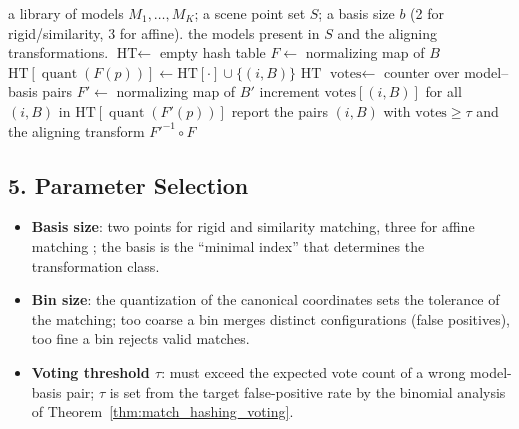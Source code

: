 \begin{algorithm}[htbp]
\caption{Geometric Hashing (Recognition)}
\label{alg:match_geometric_hashing}
\begin{algorithmic}[1]
\Require a library of models $M_1, \dots, M_K$; a scene point set $S$; a
       basis size $b$ (2 for rigid/similarity, 3 for affine).
\Ensure the models present in $S$ and the aligning transformations.
  \State $\text{HT} \gets$ empty hash table
      \State $F \gets$ normalizing map of $B$
        \State $\text{HT}[ \operatorname{quant}(F(p)) ] \gets
               \text{HT}[ \cdot ] \cup \{ (i, B) \}$
      \EndFor
    \EndFor
  \EndFor
  \State \Return $\text{HT}$
\EndFunction
{}
  \State $\text{votes} \gets$ counter over model--basis pairs
    \State $F' \gets$ normalizing map of $B'$
      \State increment $\text{votes}[(i, B)]$ for all $(i, B)$ in
             $\text{HT}[ \operatorname{quant}(F'(p)) ]$
    \EndFor
    \State report the pairs $(i, B)$ with $\text{votes} \ge \tau$ and the
           aligning transform $F'^{-1} \circ F$
  \EndFor
\EndFunction
\end{algorithmic}
\end{algorithm}

\subsection{5. Parameter Selection}

\begin{itemize}
\item \textbf{Basis size}: two points for rigid and similarity matching,
  three for affine matching \cite{wolfson1997}; the basis is the 
  ``minimal index'' that determines the transformation class.
\item \textbf{Bin size}: the quantization of the canonical coordinates sets
  the tolerance of the matching; too coarse a bin merges distinct
  configurations (false positives), too fine a bin rejects valid matches.
\item \textbf{Voting threshold $\tau$}: must exceed the expected vote count
  of a wrong model-basis pair; $\tau$ is set from the target false-positive
  rate by the binomial analysis of Theorem~\ref{thm:match_hashing_voting}.
\end{itemize}

